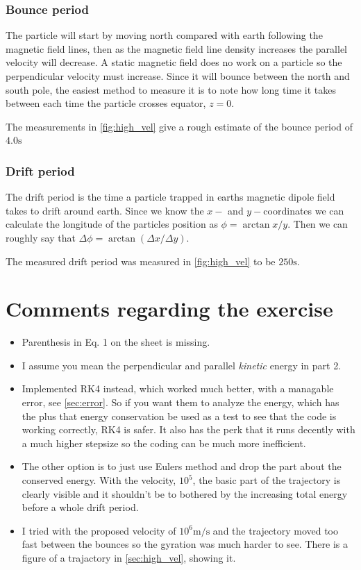 \documentclass[x11names]{article}
\begin{document}
    \subsubsection{Bounce period}
    The particle will start by moving north compared with earth following the magnetic field lines, then as the magnetic field line density increases the parallel velocity will decrease. A static magnetic field does no work on a particle so the perpendicular velocity must increase. Since it will bounce between the north and south pole, the easiest method to measure it is to note how long time it takes between each time the particle crosses equator, \(z = 0\).

    The measurements in \cref{fig:high_vel} give a rough estimate of the bounce period of \( 4.0 \si{\second}\)

    \subsubsection{Drift period}
    The drift period is the time a particle trapped in earths magnetic dipole field takes to drift around earth. Since we know the \(x-\) and \(y-\)coordinates we can calculate the longitude of the particles position as \( \phi = \arctan{x/y} \). Then we can roughly say that \(\Delta \phi = \arctan(\Delta x / \Delta y) \).

    The measured drift period was measured in \cref{fig:high_vel} to be \(250 \si{\second}\).


\appendix
\section{Comments regarding the exercise}
      \begin{itemize}
            \item Parenthesis in Eq. 1 on the sheet is missing.
            \item I assume you mean the perpendicular and parallel \textit{kinetic} energy in part 2.
            \item Implemented RK4 instead, which worked much better, with a managable error, see \cref{sec:error}. So if you want them to analyze the energy, which has the plus that energy conservation be used as a test to see that the code is working correctly, RK4 is safer. It also has the perk that it runs decently with a much higher stepsize so the coding can be much more inefficient.
            \item The other option is to just use Eulers method and drop the part about the conserved energy. With the velocity, \(10^5\), the basic part of the trajectory is clearly visible and it shouldn't be to bothered by the increasing total energy before a whole drift period.
            \item I tried with the proposed velocity of \(10^6 \si{\meter\per\second}\) and the trajectory moved too fast between the bounces so the gyration was much harder to see. There is a figure of a trajactory in \cref{sec:high_vel}, showing it.
      \end{itemize}
\end{document}

